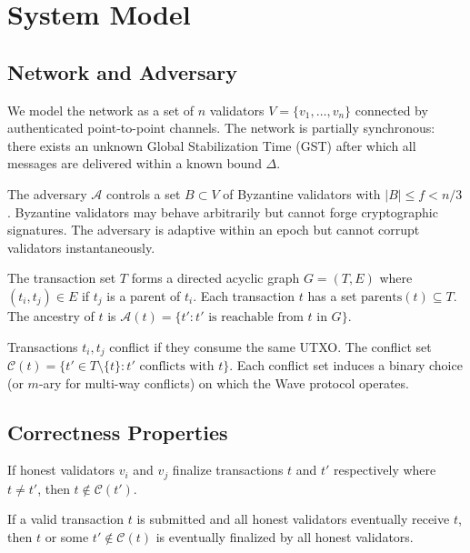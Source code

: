 \section{System Model}

\label{sec:wave-model}

\subsection{Network and Adversary}

We model the network as a set of $n$ validators $V = \{v_1, \ldots, v_n\}$ connected
by authenticated point-to-point channels. The network is partially synchronous: there
exists an unknown Global Stabilization Time (GST) after which all messages are delivered
within a known bound $\Delta$.

\begin{definition}
The adversary $\mathcal{A}$ controls a set $B \subset V$ of Byzantine validators with
$|B| \leq f < n/3$. Byzantine validators may behave arbitrarily but cannot forge
cryptographic signatures. The adversary is adaptive within an epoch but cannot corrupt
validators instantaneously.
\end{definition}

\begin{definition}
\label{def:wave-dag}
The transaction set $T$ forms a directed acyclic graph $G = (T, E)$ where $(t_i, t_j) \in E$
if $t_j$ is a parent of $t_i$. Each transaction $t$ has a set $\text{parents}(t) \subseteq T$.
The ancestry of $t$ is $\mathcal{A}(t) = \{t' : t' \text{ is reachable from } t \text{ in } G\}$.
\end{definition}

\begin{definition}
Transactions $t_i, t_j$ conflict if they consume the same UTXO. The conflict set
$\mathcal{C}(t) = \{t' \in T \setminus \{t\} : t' \text{ conflicts with } t\}$.
Each conflict set induces a binary choice (or $m$-ary for multi-way conflicts) on which
the Wave protocol operates.
\end{definition}

\subsection{Correctness Properties}

\begin{definition}[Safety]
If honest validators $v_i$ and $v_j$ finalize transactions $t$ and $t'$ respectively
where $t \neq t'$, then $t \notin \mathcal{C}(t')$.
\end{definition}

\begin{definition}[Liveness]
If a valid transaction $t$ is submitted and all honest validators eventually receive $t$,
then $t$ or some $t' \notin \mathcal{C}(t)$ is eventually finalized by all honest validators.
\end{definition}

